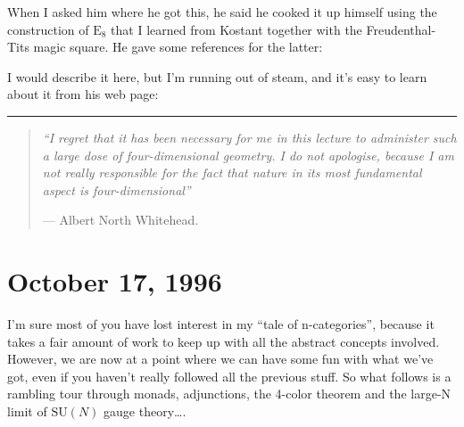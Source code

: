 \documentclass{article}
\def\tightlist{}
\renewcommand{\texttt}[1]{%
  \begingroup
  \ttfamily
  \begingroup\lccode`~=`/\lowercase{\endgroup\def~}{/\discretionary{}{}{}}%
  \begingroup\lccode`~=`[\lowercase{\endgroup\def~}{[\discretionary{}{}{}}%
  \begingroup\lccode`~=`.\lowercase{\endgroup\def~}{.\discretionary{}{}{}}%
  \catcode`/=\active\catcode`[=\active\catcode`.=\active
  \scantokens{#1\noexpand}%
  \endgroup
}
\begin{document}
When I asked him where he got this, he said he cooked it up himself
using the construction of \(\mathrm{E}_8\) that I learned from Kostant
together with the Freudenthal-Tits magic square. He gave some references
for the latter:


I would describe it here, but I'm running out of steam, and it's easy to
learn about it from his web page:


\begin{center}\rule{0.5\linewidth}{0.5pt}\end{center}

\begin{quote}
\emph{``I regret that it has been necessary for me in this lecture to
administer such a large dose of four-dimensional geometry. I do not
apologise, because I am not really responsible for the fact that nature
in its most fundamental aspect is four-dimensional''}

--- Albert North Whitehead.
\end{quote}



\hypertarget{week92}{%
\section{October 17, 1996}\label{week92}}

I'm sure most of you have lost interest in my ``tale of n-categories'',
because it takes a fair amount of work to keep up with all the abstract
concepts involved. However, we are now at a point where we can have some
fun with what we've got, even if you haven't really followed all the
previous stuff. So what follows is a rambling tour through monads,
adjunctions, the 4-color theorem and the large-N limit of
\(\mathrm{SU}(N)\) gauge theory\ldots.
\end{document}

